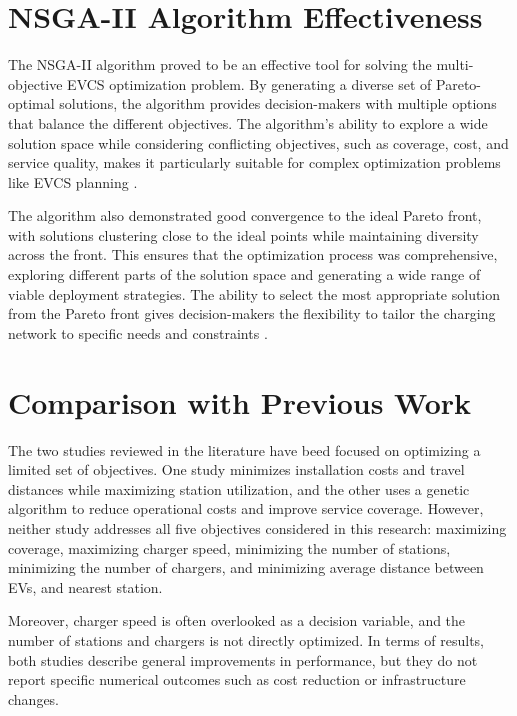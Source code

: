 \section{NSGA-II Algorithm Effectiveness}

The NSGA-II algorithm proved to be an effective tool for solving the multi-objective EVCS optimization problem. By generating a diverse set of Pareto-optimal solutions, the algorithm provides decision-makers with multiple options that balance the different objectives. The algorithm’s ability to explore a wide solution space while considering conflicting objectives, such as coverage, cost, and service quality, makes it particularly suitable for complex optimization problems like EVCS planning \citep{A multi-objective optimization model for electric vehicle charging station location planning}.

The algorithm also demonstrated good convergence to the ideal Pareto front, with solutions clustering close to the ideal points while maintaining diversity across the front. This ensures that the optimization process was comprehensive, exploring different parts of the solution space and generating a wide range of viable deployment strategies. The ability to select the most appropriate solution from the Pareto front gives decision-makers the flexibility to tailor the charging network to specific needs and constraints \citep{A multi-objective optimization model for electric vehicle charging station location planning}.

\section{Comparison with Previous Work}

The two studies reviewed in the literature have beed focused on optimizing a limited set of objectives. One study minimizes installation costs and travel distances while maximizing station utilization, and the other uses a genetic algorithm to reduce operational costs and improve service coverage. However, neither study addresses all five objectives considered in this research: maximizing coverage, maximizing charger speed, minimizing the number of stations, minimizing the number of chargers, and minimizing average distance between EVs, and nearest station. 

Moreover, charger speed is often overlooked as a decision variable, and the number of stations and chargers is not directly optimized. In terms of results, both studies describe general improvements in performance, but they do not report specific numerical outcomes such as cost reduction or infrastructure changes.

